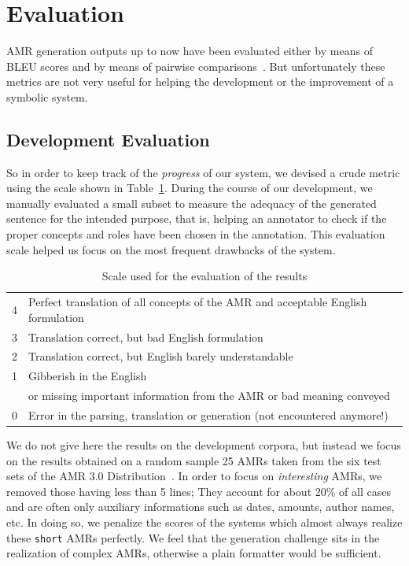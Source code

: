 \documentclass[12pt]{article}
\newcommand{\representation}[1]{\textsf{#1}}
\newcommand{\AMR}{\representation{AMR}}
\begin{document}
\section{Evaluation} %
\label{sec:evaluation}

\AMR{} generation outputs up to now have been evaluated either by means of BLEU scores \cite{DBLP:conf/naacl/FlaniganDSC16,DBLP:conf/inlg/PourdamghaniKH16,bevilacqua-etal-2021-one} and by means of pairwise comparisons~\cite{SemEval2017-T9-Desc}. But unfortunately these metrics are not very useful for helping the development or the improvement of a symbolic system.

\subsection{Development Evaluation} %
\label{sub:development_evaluation}

So in order to keep track of the \emph{progress} of our system, we devised a crude metric
using the scale shown in Table~\ref{tab:evaluation-scale}. During the course of our development, we manually evaluated a small subset to measure the adequacy of the generated sentence for the intended purpose, that is, helping an annotator to check if the proper concepts and roles have been chosen in the annotation. This evaluation scale helped us focus on the most frequent drawbacks of the system. 

\begin{table}[ht]
\centering
 \begin{tabular}{ll}
  4 & Perfect translation of all concepts of the \AMR{} and acceptable English formulation\\
  3 & Translation correct, but bad English formulation\\
  2 & Translation correct, but English barely understandable\\
  1 & Gibberish in the English\\ 
    & or missing important information from the \AMR{} or bad meaning conveyed\\
  0 & Error in the parsing, translation or generation (not encountered anymore!)\\
 \end{tabular}
\caption{Scale used for the evaluation of the results}
\label{tab:evaluation-scale}
\end{table}

We do not give here the results on the development corpora, but instead we focus on the results obtained on a random sample 25 \AMR{}s taken from the six test sets of the AMR 3.0 Distribution~\cite{AMR-Release3}. In order to focus on \emph{interesting} \AMR{}s, we removed those having less than 5 lines; They account for about 20\% of all cases and are often only auxiliary informations such as dates, amounts, author names, etc. In doing so, we penalize the scores of the systems which almost always realize these \texttt{short} \AMR{}s perfectly. We feel that the generation challenge sits in the realization of complex \AMR{}s, otherwise a plain formatter would be sufficient.
\end{document}
